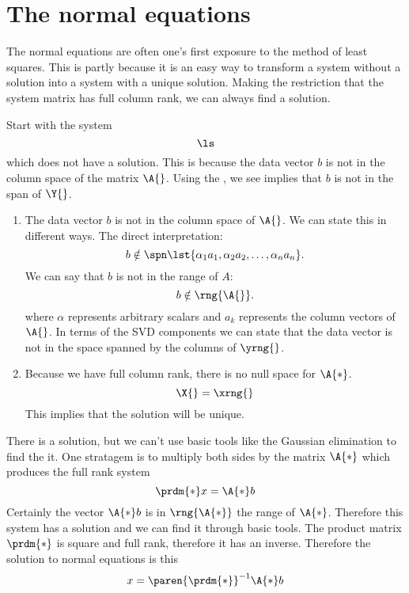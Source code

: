 \section{The normal equations}
The normal equations are often one's first exposure to the method of least squares. This is partly because it is an easy way to transform a system without a solution into a system with a unique solution. Making the restriction that the system matrix has full column rank, we can always find a solution.

Start with the system
\begin{equation*}
  \ls
\end{equation*}
which does not have a solution. This is because the data vector $b$ is not in the column space of the matrix $\A{}$. Using the \ft, we see implies that $b$ is not in the span of $\Y{}$.
\begin{enumerate}
\item The data vector $b$ is not in the column space of $\A{}$. We can state this in different ways.
\subitem The direct interpretation:
\begin{equation}
  b \notin \spn \lst{ \alpha_{1} a_{1}, \alpha_{2} a_{2}, \dots,  \alpha_{n} a_{n} }.
\end{equation}
\subitem We can say that $b$ is not in the range of $A{}$:
\begin{equation}
  b \notin \rng{ \A{} }.
\end{equation}
where $\alpha$ represents arbitrary scalars and $a_{k}$ represents the column vectors of $\A{}$.
\subitem In terms of the SVD components we can state that the data vector is not in the space spanned by the columns of $\yrng{}$.
\item Because we have full column rank, there is no null space for $\A{*}$.
\begin{equation}
  \X{} = \xrng{}
\end{equation}
This implies that the solution will be unique.
\end{enumerate}

There is a solution, but we can't use basic tools like the Gaussian elimination to find the it.
One stratagem is to multiply both sides by the matrix $\A{*}$ which produces the full rank system
\begin{equation}
  \prdm{*}x = \A{*}b
\end{equation}
Certainly the vector $\A{*}b$ is in $\rng{\A{*}}$ the range of $\A{*}$. Therefore this system has a solution and we can find it through basic tools. The product matrix $\prdm{*}$ is square and full rank, therefore it has an inverse. Therefore the solution to normal equations is this
\begin{equation}
  x = \paren{\prdm{*}}^{-1}\A{*}b
\end{equation}

